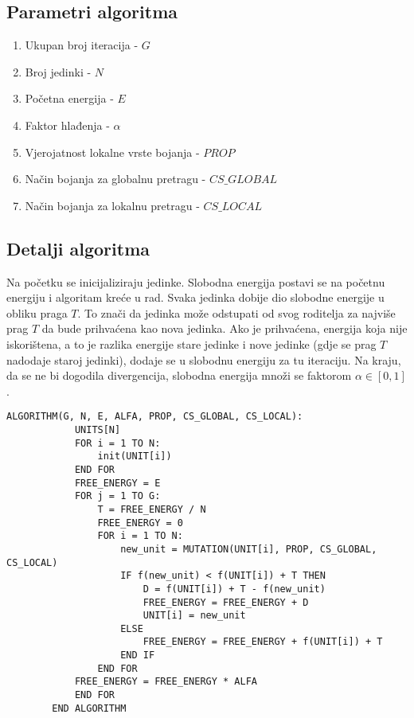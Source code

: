 \documentclass[times, utf8, diplomski, numeric]{fer}
\begin{document}
\subsection{Parametri algoritma}

\begin{enumerate}
	\item Ukupan broj iteracija - $G$
	\item Broj jedinki - $N$
	\item Početna energija - $E$
	\item Faktor hlađenja - $\alpha$
	\item Vjerojatnost lokalne vrste bojanja - $PROP$
	\item Način bojanja za globalnu pretragu - $CS\_GLOBAL$
	\item Način bojanja za lokalnu pretragu - $CS\_LOCAL$
\end{enumerate}


\subsection{Detalji algoritma}

Na početku se inicijaliziraju jedinke. Slobodna energija postavi se na početnu energiju i algoritam kreće u rad. Svaka jedinka dobije dio slobodne energije u obliku praga $T$. To znači da jedinka može odstupati od svog roditelja za najviše prag $T$ da bude prihvaćena kao nova jedinka. Ako je prihvaćena, energija koja nije iskorištena, a to je razlika energije stare jedinke i nove jedinke (gdje se prag $T$ nadodaje staroj jedinki), dodaje se u slobodnu energiju za tu iteraciju. Na kraju, da se ne bi dogodila divergencija, slobodna energija množi se faktorom $\alpha \in [0,1]$.  

\begin{singlespace}
	\begin{lstlisting}[caption=Pseudok\^{o}d genetskog kaljenja]
		ALGORITHM(G, N, E, ALFA, PROP, CS_GLOBAL, CS_LOCAL):
			UNITS[N]
			FOR i = 1 TO N:
				init(UNIT[i])
			END FOR
			FREE_ENERGY = E
			FOR j = 1 TO G:
				T = FREE_ENERGY / N
				FREE_ENERGY = 0
				FOR i = 1 TO N:
					new_unit = MUTATION(UNIT[i], PROP, CS_GLOBAL, CS_LOCAL)
					IF f(new_unit) < f(UNIT[i]) + T THEN
						D = f(UNIT[i]) + T - f(new_unit)
						FREE_ENERGY = FREE_ENERGY + D
						UNIT[i] = new_unit
					ELSE
						FREE_ENERGY = FREE_ENERGY + f(UNIT[i]) + T
					END IF
				END FOR
			FREE_ENERGY = FREE_ENERGY * ALFA
			END FOR
		END ALGORITHM
	\end{lstlisting}
\end{singlespace}
\end{document}
